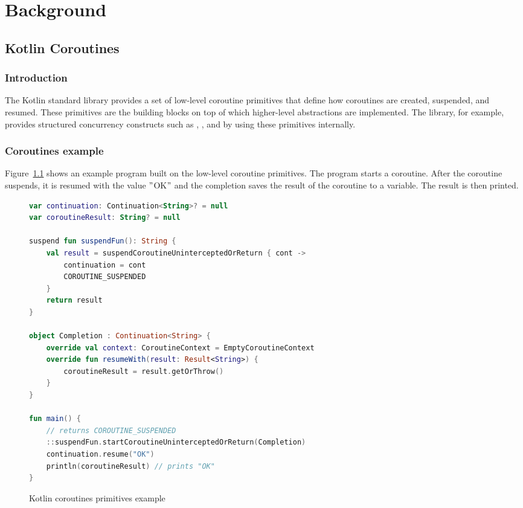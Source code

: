 \chapter{Background}
\label{ch:background}
\raggedbottom

\section{Kotlin Coroutines}
\label{sec:kotlin-coroutines}

\subsection{Introduction}

The Kotlin standard library provides a set of low-level coroutine primitives that define how
coroutines are created, suspended, and resumed. These primitives are the building blocks on top of which
higher-level abstractions are implemented. The  library, for example,
provides structured concurrency constructs such as , , and
 by using these primitives internally.

\subsection{Coroutines example}

Figure~\ref{fig:kotlin-coroutines-example} shows an example program built on the low-level
coroutine primitives. The program starts a coroutine. After the coroutine suspends, it is resumed
with the value \("\)OK\("\) and the completion saves the result of the coroutine to a variable. The result is
then printed.

\begin{figure}[H]
    \centering
    \begin{lstlisting}[language=Kotlin, label={lst:kotlin-coroutines-example}]
var continuation: Continuation<String>? = null
var coroutineResult: String? = null

suspend fun suspendFun(): String {
    val result = suspendCoroutineUninterceptedOrReturn { cont ->
        continuation = cont
        COROUTINE_SUSPENDED
    }
    return result
}

object Completion : Continuation<String> {
    override val context: CoroutineContext = EmptyCoroutineContext
    override fun resumeWith(result: Result<String>) {
        coroutineResult = result.getOrThrow()
    }
}

fun main() {
    // returns COROUTINE_SUSPENDED
    ::suspendFun.startCoroutineUninterceptedOrReturn(Completion)
    continuation.resume("OK")
    println(coroutineResult) // prints "OK"
}
    \end{lstlisting}
    \caption{Kotlin coroutines primitives example}
    \label{fig:kotlin-coroutines-example}
\end{figure}

